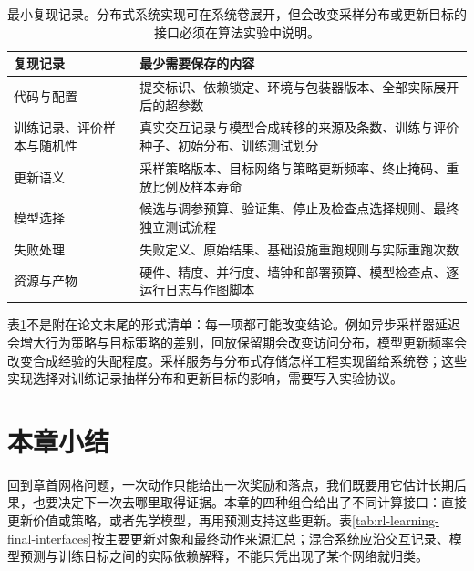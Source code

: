 \begin{table}[t]
  \centering
  \small
  \begin{tabularx}{\linewidth}{>{\raggedright\arraybackslash}p{28mm} >{\raggedright\arraybackslash}X}
    \toprule
    复现记录 & 最少需要保存的内容 \\
    \midrule
    代码与配置 & 提交标识、依赖锁定、环境与包装器版本、全部实际展开后的超参数 \\
    训练记录、评价样本与随机性 & 真实交互记录与模型合成转移的来源及条数、训练与评价种子、初始分布、训练测试划分 \\
    更新语义 & 采样策略版本、目标网络与策略更新频率、终止掩码、重放比例及样本寿命 \\
    模型选择 & 候选与调参预算、验证集、停止及检查点选择规则、最终独立测试流程 \\
    失败处理 & 失败定义、原始结果、基础设施重跑规则与实际重跑次数 \\
    资源与产物 & 硬件、精度、并行度、墙钟和部署预算、模型检查点、逐运行日志与作图脚本 \\
    \bottomrule
  \end{tabularx}
  \caption{最小复现记录。分布式系统实现可在系统卷展开，但会改变采样分布或更新目标的接口必须在算法实验中说明。}
  \label{tab:rl-learning-reproducibility}
\end{table}

表\ref{tab:rl-learning-reproducibility}不是附在论文末尾的形式清单：每一项都可能改变结论。例如异步采样器延迟会增大行为策略与目标策略的差别，回放保留期会改变访问分布，模型更新频率会改变合成经验的失配程度。采样服务与分布式存储怎样工程实现留给系统卷；这些实现选择对训练记录抽样分布和更新目标的影响，需要写入实验协议。

\section{本章小结}
\label{sec:rl-learning-summary}

回到章首网格问题，一次动作只能给出一次奖励和落点，我们既要用它估计长期后果，也要决定下一次去哪里取得证据。本章的四种组合给出了不同计算接口：直接更新价值或策略，或者先学模型，再用预测支持这些更新。表\ref{tab:rl-learning-final-interfaces}按主要更新对象和最终动作来源汇总；混合系统应沿交互记录、模型预测与训练目标之间的实际依赖解释，不能只凭出现了某个网络就归类。

